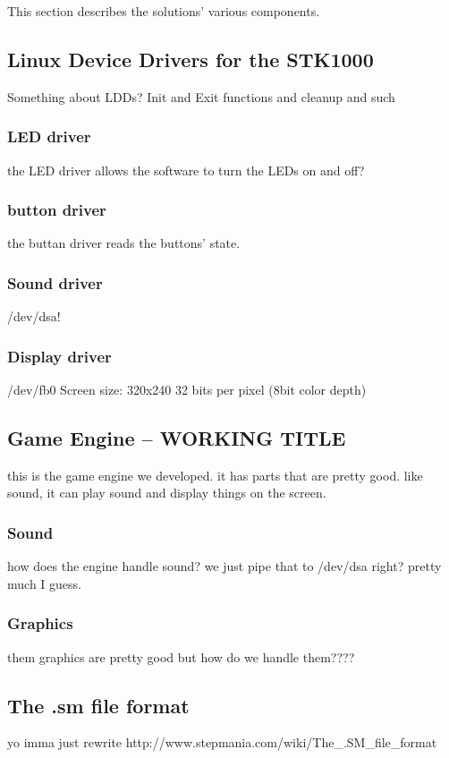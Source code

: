 This section describes the solutions' various components.

\subsection{Linux Device Drivers for the STK1000}
	Something about LDDs?
	Init and Exit functions and cleanup and such

	\subsubsection{LED driver}
		the LED driver allows the software to turn the LEDs on and off?
	\subsubsection{button driver}
		the buttan driver reads the buttons' state.	

	\subsubsection{Sound driver}
		/dev/dsa!
	\subsubsection{Display driver}
		/dev/fb0
		Screen size: 320x240
		32 bits per pixel (8bit color depth)

\subsection{Game Engine -- WORKING TITLE}
	this is the game engine we developed. it has parts that are pretty good. like sound, it can play sound and display things on the screen.
	\subsubsection{Sound}
		how does the engine handle sound?
		we just pipe that to /dev/dsa right?
		pretty much I guess.
	\subsubsection{Graphics}
		them graphics are pretty good but how do we handle them????

\subsection{The .sm file format}
	yo imma just rewrite http://www.stepmania.com/wiki/The_.SM_file_format